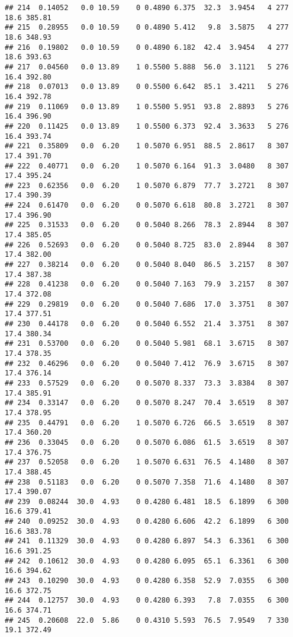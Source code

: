 \documentclass[
]{article}
\begin{document}
\begin{verbatim}
## 214  0.14052   0.0 10.59    0 0.4890 6.375  32.3  3.9454   4 277    18.6 385.81
## 215  0.28955   0.0 10.59    0 0.4890 5.412   9.8  3.5875   4 277    18.6 348.93
## 216  0.19802   0.0 10.59    0 0.4890 6.182  42.4  3.9454   4 277    18.6 393.63
## 217  0.04560   0.0 13.89    1 0.5500 5.888  56.0  3.1121   5 276    16.4 392.80
## 218  0.07013   0.0 13.89    0 0.5500 6.642  85.1  3.4211   5 276    16.4 392.78
## 219  0.11069   0.0 13.89    1 0.5500 5.951  93.8  2.8893   5 276    16.4 396.90
## 220  0.11425   0.0 13.89    1 0.5500 6.373  92.4  3.3633   5 276    16.4 393.74
## 221  0.35809   0.0  6.20    1 0.5070 6.951  88.5  2.8617   8 307    17.4 391.70
## 222  0.40771   0.0  6.20    1 0.5070 6.164  91.3  3.0480   8 307    17.4 395.24
## 223  0.62356   0.0  6.20    1 0.5070 6.879  77.7  3.2721   8 307    17.4 390.39
## 224  0.61470   0.0  6.20    0 0.5070 6.618  80.8  3.2721   8 307    17.4 396.90
## 225  0.31533   0.0  6.20    0 0.5040 8.266  78.3  2.8944   8 307    17.4 385.05
## 226  0.52693   0.0  6.20    0 0.5040 8.725  83.0  2.8944   8 307    17.4 382.00
## 227  0.38214   0.0  6.20    0 0.5040 8.040  86.5  3.2157   8 307    17.4 387.38
## 228  0.41238   0.0  6.20    0 0.5040 7.163  79.9  3.2157   8 307    17.4 372.08
## 229  0.29819   0.0  6.20    0 0.5040 7.686  17.0  3.3751   8 307    17.4 377.51
## 230  0.44178   0.0  6.20    0 0.5040 6.552  21.4  3.3751   8 307    17.4 380.34
## 231  0.53700   0.0  6.20    0 0.5040 5.981  68.1  3.6715   8 307    17.4 378.35
## 232  0.46296   0.0  6.20    0 0.5040 7.412  76.9  3.6715   8 307    17.4 376.14
## 233  0.57529   0.0  6.20    0 0.5070 8.337  73.3  3.8384   8 307    17.4 385.91
## 234  0.33147   0.0  6.20    0 0.5070 8.247  70.4  3.6519   8 307    17.4 378.95
## 235  0.44791   0.0  6.20    1 0.5070 6.726  66.5  3.6519   8 307    17.4 360.20
## 236  0.33045   0.0  6.20    0 0.5070 6.086  61.5  3.6519   8 307    17.4 376.75
## 237  0.52058   0.0  6.20    1 0.5070 6.631  76.5  4.1480   8 307    17.4 388.45
## 238  0.51183   0.0  6.20    0 0.5070 7.358  71.6  4.1480   8 307    17.4 390.07
## 239  0.08244  30.0  4.93    0 0.4280 6.481  18.5  6.1899   6 300    16.6 379.41
## 240  0.09252  30.0  4.93    0 0.4280 6.606  42.2  6.1899   6 300    16.6 383.78
## 241  0.11329  30.0  4.93    0 0.4280 6.897  54.3  6.3361   6 300    16.6 391.25
## 242  0.10612  30.0  4.93    0 0.4280 6.095  65.1  6.3361   6 300    16.6 394.62
## 243  0.10290  30.0  4.93    0 0.4280 6.358  52.9  7.0355   6 300    16.6 372.75
## 244  0.12757  30.0  4.93    0 0.4280 6.393   7.8  7.0355   6 300    16.6 374.71
## 245  0.20608  22.0  5.86    0 0.4310 5.593  76.5  7.9549   7 330    19.1 372.49

\end{verbatim}
\end{document}
